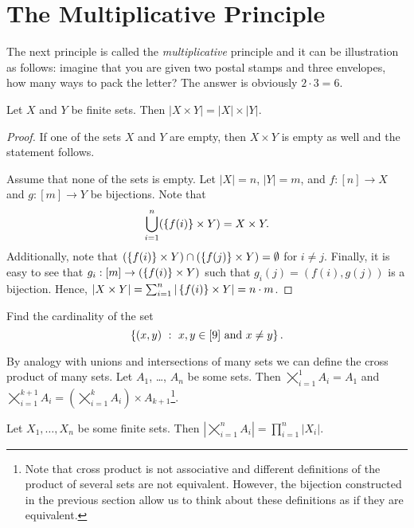 \section{The Multiplicative Principle}
The next principle is called the \emph{multiplicative} principle and it can be
illustration as follows: imagine that you are given two postal stamps and
three envelopes, how many ways to pack the letter? The answer is obviously
$2 \cdot 3 = 6$.
\begin{theorem}
  Let $X$ and $Y$ be finite sets. Then $|X \times Y| = |X| \times |Y|$.
\end{theorem}
\begin{proof}
  If one of the sets $X$ and $Y$ are empty, then $X \times Y$ is empty as well
  and the statement follows.

  Assume that none of the sets is empty. Let $|X| = n$, $|Y| = m$, and
  $f : [n] \to X$ and $g : [m] \to Y$ be bijections.
  Note that
  \[
    \bigcup_{i = 1}^n (\set{f(i)} \times Y) = X \times Y.
  \]
  Additionally, note that $(\set{f(i)} \times Y) \cap (\set{f(j)} \times Y) =
  \emptyset$ for $i \neq j$. Finally, it is easy to see that $g_i : [m] \to
  (\set{f(i)} \times Y)$ such that $g_i(j) = (f(i), g(j))$ is a bijection.
  Hence,
  $|X \times Y| = \sum_{i = 1}^n |\set{f(i)} \times Y| = n \cdot m$.
\end{proof}

\begin{exercise}
  Find the cardinality of the set
  \[
    \set[{x, y \in [9] \text{ and } x \neq y}]{(x, y)}.
  \]
\end{exercise}

By analogy with unions and intersections of many sets we can define the cross
product of many sets.
Let $A_1$, \dots, $A_n$ be some sets. Then $\bigtimes_{i = 1}^1 A_i = A_1$ and
$\bigtimes_{i = 1}^{k + 1} A_i =
  \left(\bigtimes_{i = 1}^k A_i\right) \times A_{k + 1}$\footnote{%
    Note that cross product is not associative and different definitions of the
    product of several sets are not equivalent. However, the bijection
    constructed in the previous section allow us to think about these
    definitions as if they are equivalent.
}.

\begin{corollary}
\label{corollary:multiplicative-principle}
  Let $X_1, \dots, X_n$ be some finite sets. Then
  $\left|\bigtimes_{i = 1}^n A_i\right| = \prod_{i = 1}^n |X_i|$.
\end{corollary}

